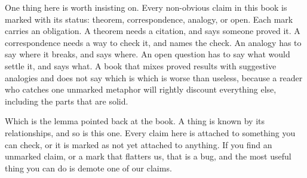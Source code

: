 One thing here is worth insisting on. Every non-obvious claim in this book is marked with its status: theorem, correspondence, analogy, or open. Each mark carries an obligation. A theorem needs a citation, and  says someone proved it. A correspondence needs a way to check it, and  names the check. An analogy has to say where it breaks, and  says where. An open question has to say what would settle it, and  says what. A book that mixes proved results with suggestive analogies and does not say which is which is worse than useless, because a reader who catches one unmarked metaphor will rightly discount everything else, including the parts that are solid.

Which is the lemma pointed back at the book. A thing is known by its relationships, and so is this one. Every claim here is attached to something you can check, or it is marked as not yet attached to anything. If you find an unmarked claim, or a mark that flatters us, that is a bug, and the most useful thing you can do is demote one of our claims.
